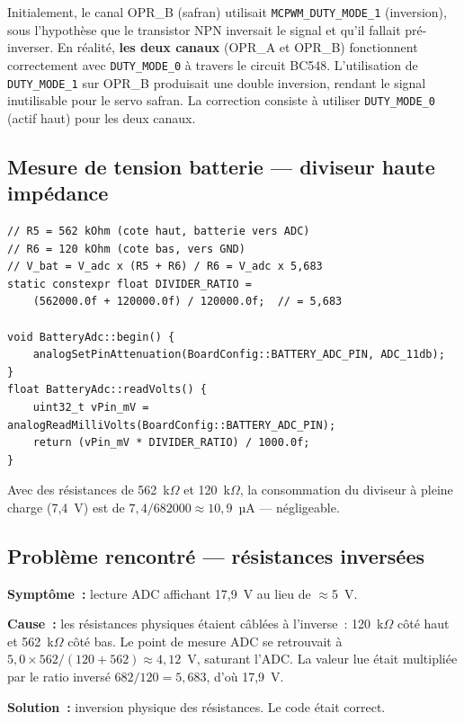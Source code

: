 \documentclass[12pt,a4paper]{article}
\begin{document}
\begin{infobox}
  Initialement, le canal OPR\_B (safran) utilisait \texttt{MCPWM\_DUTY\_MODE\_1}
  (inversion), sous l'hypothèse que le transistor NPN inversait le signal et
  qu'il fallait pré-inverser. En réalité, \textbf{les deux canaux} (OPR\_A et
  OPR\_B) fonctionnent correctement avec \texttt{DUTY\_MODE\_0} à travers
  le circuit BC548. L'utilisation de \texttt{DUTY\_MODE\_1} sur OPR\_B
  produisait une double inversion, rendant le signal inutilisable pour le
  servo safran. La correction consiste à utiliser \texttt{DUTY\_MODE\_0}
  (actif haut) pour les deux canaux.
\end{infobox}

\subsection{Mesure de tension batterie — diviseur haute impédance}

\begin{lstlisting}[style=cpp, caption={BatteryAdc.cpp -- calcul de tension}]
// R5 = 562 kOhm (cote haut, batterie vers ADC)
// R6 = 120 kOhm (cote bas, vers GND)
// V_bat = V_adc x (R5 + R6) / R6 = V_adc x 5,683
static constexpr float DIVIDER_RATIO =
    (562000.0f + 120000.0f) / 120000.0f;  // = 5,683

void BatteryAdc::begin() {
    analogSetPinAttenuation(BoardConfig::BATTERY_ADC_PIN, ADC_11db);
}
float BatteryAdc::readVolts() {
    uint32_t vPin_mV = analogReadMilliVolts(BoardConfig::BATTERY_ADC_PIN);
    return (vPin_mV * DIVIDER_RATIO) / 1000.0f;
}
\end{lstlisting}

Avec des résistances de 562~k$\Omega$ et 120~k$\Omega$, la consommation du
diviseur à pleine charge (7,4~V) est de $7{,}4 / 682000 \approx 10{,}9$~µA —
négligeable.

\subsection{Problème rencontré — résistances inversées}

\begin{warningbox}
  \textbf{Symptôme~:} lecture ADC affichant 17,9~V au lieu de $\approx$5~V.

  \textbf{Cause~:} les résistances physiques étaient câblées à l'inverse~:
  120~k$\Omega$ côté haut et 562~k$\Omega$ côté bas. Le point de mesure ADC
  se retrouvait à $5{,}0 \times 562/(120+562) \approx 4{,}12$~V, saturant
  l'ADC. La valeur lue était multipliée par le ratio inversé
  $682/120 = 5{,}683$, d'où 17,9~V.

  \textbf{Solution~:} inversion physique des résistances. Le code était correct.
\end{warningbox}
\end{document}
